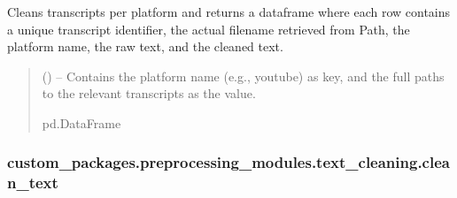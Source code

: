 \documentclass[letterpaper,10pt,english]{sphinxhowto}
\begin{document}
\begin{fulllineitems}
\label{\detokenize{_autosummary/custom_packages.preprocessing_modules.text_cleaning.clean_transcripts:custom_packages.preprocessing_modules.text_cleaning.clean_transcripts}}
\pysigstartsignatures
\pysiglinewithargsret
{}
{}
{}
\pysigstopsignatures
\sphinxAtStartPar
Cleans transcripts per platform and returns a dataframe where each row contains
a unique transcript identifier, the actual filename retrieved from Path,
the platform name, the raw text, and the cleaned text.
\begin{quote}\begin{description}
\sphinxAtStartPar
{} (\sphinxstyleliteralemphasis{\sphinxupquote{{[}}}\sphinxstyleliteralemphasis{\sphinxupquote{, }}\sphinxstyleliteralemphasis{\sphinxupquote{{[}}}\sphinxstyleliteralemphasis{\sphinxupquote{{]}}}\sphinxstyleliteralemphasis{\sphinxupquote{{]}}}) – Contains the platform name (e.g., youtube) as key, and the full paths
to the relevant transcripts as the value.

\sphinxAtStartPar
pd.DataFrame

\end{description}\end{quote}

\end{fulllineitems}


\sphinxstepscope


\subsubsection{custom\_packages.preprocessing\_modules.text\_cleaning.clean\_text}
\label{\detokenize{_autosummary/custom_packages.preprocessing_modules.text_cleaning.clean_text:custom-packages-preprocessing-modules-text-cleaning-clean-text}}\label{\detokenize{_autosummary/custom_packages.preprocessing_modules.text_cleaning.clean_text::doc}}
\end{document}
